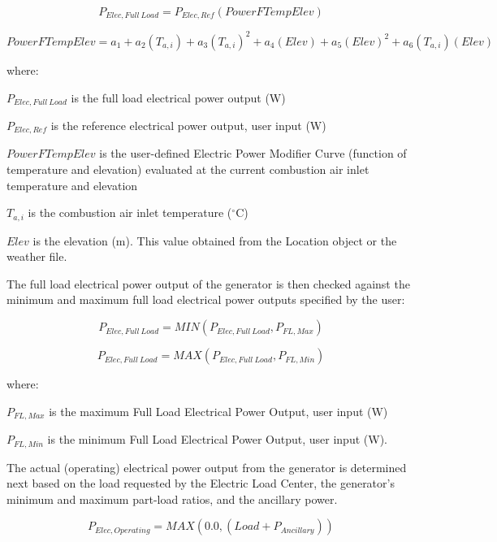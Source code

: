 \begin{equation}
{P_{Elec,Full~Load}} = {P_{Elec,Ref}}\left( {PowerFTempElev} \right)
\end{equation}

\begin{equation}
PowerFTempElev = {a_1} + {a_2}\left( {{T_{a,i}}} \right) + {a_3}{\left( {{T_{a,i}}} \right)^2} + {a_4}\left( {Elev} \right) + {a_5}{\left( {Elev} \right)^2} + {a_6}\left( {{T_{a,i}}} \right)\left( {Elev} \right)
\end{equation}

where:

\({P_{Elec,Full~Load}}\) is the full load electrical power output (W)

\({P_{Elec,Ref}}\) is the reference electrical power output, user input (W)

\(PowerFTempElev\) is the user-defined Electric Power Modifier Curve (function of temperature and elevation) evaluated at the current combustion air inlet temperature and elevation

\({T_{a,i}}\) is the combustion air inlet temperature (\(^{\circ}\)C)

\(Elev\) is the elevation (m). This value obtained from the Location object or the weather file.

The full load electrical power output of the generator is then checked against the minimum and maximum full load electrical power outputs specified by the user:

\begin{equation}
{P_{Elec,Full~Load}} = MIN\left( {{P_{Elec,Full~Load}},{P_{FL,Max}}} \right)
\end{equation}

\begin{equation}
{P_{Elec,Full~Load}} = MAX\left( {{P_{Elec,Full~Load}},{P_{FL,Min}}} \right)
\end{equation}

where:

\({P_{FL,Max}}\) is the maximum Full Load Electrical Power Output, user input (W)

\({P_{FL,Min}}\) is the minimum Full Load Electrical Power Output, user input (W).

The actual (operating) electrical power output from the generator is determined next based on the load requested by the Electric Load Center, the generator's minimum and maximum part-load ratios, and the ancillary power.

\begin{equation}
{P_{Elec,Operating}} = MAX\left( {0.0,\left( {Load + {P_{Ancillary}}} \right)} \right)
\end{equation}


